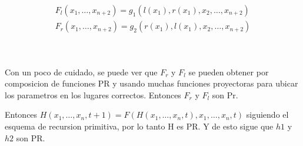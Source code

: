 \documentclass{report}
\begin{document}
\begin{myproof}
\begin{myproof}
		$$
		\begin{aligned}
			F_{l}(x_{1},\ldots,x_{n+2})=g_{1}(l(x_{1}),r(x_{1}),x_{2},\ldots,x_{n+2})\\F_{r}(x_{1},\ldots,x_{n+2})=g_{2}(r(x_{1}),l(x_{1}),x_{2},\ldots,x_{n+2}) \\
		\end{aligned}
		$$

		~

		Con un poco de cuidado, se puede ver que $F_r$ y $F_l$ se pueden obtener por composicion de funciones PR y usando muchas funciones proyectoras para
		ubicar los parametros en los lugares correctos. Entonces $F_r$ y $F_l$ son Pr. 
	\end{myproof}

	Entonces $H(x_1,\ldots,x_n,t+1)=F(H(x_1,\ldots,x_n,t),x_1,\ldots,x_n,t)$ siguiendo el esquema de recursion primitiva, por lo tanto H es PR.
	Y de esto sigue que $h1$ y $h2$ son PR.
\end{myproof}
\end{document}
